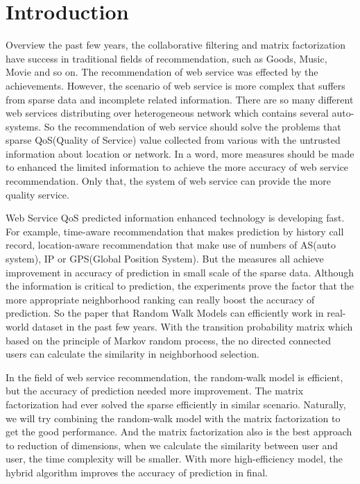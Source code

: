 \documentclass[conference]{IEEEtran}
\begin{document}
\section{Introduction}
\par Overview the past few years, the collaborative filtering and matrix factorization have success in traditional fields of recommendation, such as Goods, Music, Movie and so on. The recommendation of web service was effected by the achievements. However, the scenario of web service is more complex that suffers from sparse data and incomplete related information. There are so many different web services distributing over heterogeneous network which contains several auto-systems. So the recommendation of web service should solve the problems that sparse QoS(Quality of Service) value collected from various with the untrusted information about location or network. In a word, more measures should be made to enhanced the limited information to achieve the more accuracy of web service recommendation\cite{zheng_wsrec:_2009}\cite{zheng_qos-aware_2011}. Only that, the system of web service can provide the more quality service.
\par Web Service QoS predicted information enhanced technology is developing fast. For example, time-aware recommendation that makes prediction by history call record, location-aware recommendation\cite{liu_location-aware_2016}\cite{xia_domain-aware_2014}\cite{tang_location-aware_2012} that make use of numbers of AS(auto system), IP or GPS(Global Position System). But the measures all achieve improvement in accuracy of prediction in small scale of the sparse data. Although the information is critical to prediction, the experiments prove the factor that the more appropriate neighborhood ranking\cite{lo_efficient_2014} can really boost the accuracy of prediction. So the paper that Random Walk Models\cite{yin_network_2017}\cite{park_comparative_2017} can efficiently work in real-world dataset in the past few years. With the transition probability matrix which based on the principle of Markov random process\cite{mohammed_markov_2016}, the no directed connected users can calculate the similarity in neighborhood selection.
\par In the field of web service recommendation, the random-walk model is efficient, but the accuracy of prediction needed more improvement. The matrix factorization\cite{yu_personalized_2014}\cite{ma_predicting_2015} had ever solved the sparse efficiently in similar scenario. Naturally, we will try combining the random-walk model with the matrix factorization to get the good performance. And the matrix factorization also is the best approach to reduction of dimensions, when we calculate the similarity between user and user, the time complexity will be smaller. With more high-efficiency model\cite{rodriguez-mier_hybrid_2017}, the hybrid algorithm improves the accuracy of prediction in final.
\end{document}
